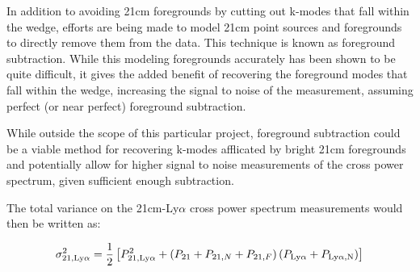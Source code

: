 In addition to avoiding 21cm foregrounds by cutting out k-modes that fall within
the wedge, efforts are being made to model 21cm point sources and foregrounds to
directly remove them from the data. This technique is known as foreground subtraction.
While this modeling foregrounds accurately has been shown to be quite difficult,
it gives the added benefit of recovering the foreground modes that fall within
the wedge, increasing the signal to noise of the measurement, assuming perfect (or
near perfect) foreground subtraction.

While outside the scope of this particular project, foreground subtraction could
be a viable method for recovering k-modes afflicated by bright 21cm foregrounds
and potentially allow for higher signal to noise measurements of the cross power
spectrum, given sufficient enough subtraction.


The total variance on the 21cm-Ly$\alpha$ cross power spectrum measurements would
then be written as:

\begin{equation}
    	\sigma^2_{21, \rm Ly\alpha} = \frac{1}{2} \left[ P^2_{21, \rm Ly\alpha} +
      \left(P_{21} + P_{21, N} + P_{21, F} \right) \left( P_{\rm Ly\alpha} + P_{\text{Ly}\alpha, \text{N}}\right) \right]
\end{equation}
